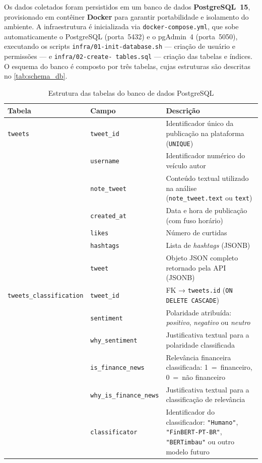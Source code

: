 Os dados coletados foram persistidos em um banco de dados \textbf{PostgreSQL~15}, provisionado em contêiner \textbf{Docker} para garantir portabilidade e isolamento do ambiente. A infraestrutura é inicializada via \texttt{docker-compose.yml}, que sobe automaticamente o PostgreSQL (porta~5432) e o pgAdmin~4 (porta~5050), executando os scripts \texttt{infra/01-init-database.sh} --- criação de usuário e permissões --- e \texttt{infra/02-create- tables.sql} --- criação das tabelas e índices. O esquema do banco é composto por três tabelas, cujas estruturas são descritas no \autoref{tab:schema_db}.

\begin{table}[!htb]
	\caption{Estrutura das tabelas do banco de dados PostgreSQL}
	\label{tab:schema_db}
	
	\begin{tabular}{p{4.5cm}p{4.5cm}p{5.8cm}}
		\hline
		\textbf{Tabela} & \textbf{Campo} & \textbf{Descrição} \\
		\hline
		\texttt{tweets} & \texttt{tweet\_id} & Identificador único da publicação na plataforma (\texttt{UNIQUE}) \\ & \texttt{username} & Identificador numérico do veículo autor \\
		& \texttt{note\_tweet} & Conteúdo textual utilizado na análise (\texttt{note\_tweet.text} ou \texttt{text}) \\ & \texttt{created\_at} & Data e hora de publicação (com fuso horário) \\ & \texttt{likes}
		& Número de curtidas \\ & \texttt{hashtags} & Lista de \textit{hashtags} (JSONB) \\ & \texttt{tweet} & Objeto JSON completo retornado pela API
		(JSONB) \\
		\hline
		\texttt{tweets\_classification} & \texttt{tweet\_id} & FK → \texttt{tweets.id} (\texttt{ON DELETE CASCADE}) \\ & \texttt{sentiment} & Polaridade atribuída: \textit{positivo}, \textit{negativo} ou \textit{neutro} \\ & \texttt{why\_sentiment} & Justificativa textual para a polaridade classificada \\ & \texttt{is\_finance\_news}   & Relevância financeira classificada: 1~=~financeiro, 0~=~não financeiro \\ & \texttt{why\_is\_finance\_news} & Justificativa textual para a classificação de relevância \\ & \texttt{classificator} & Identificador do classificador: \texttt{"Humano"}, \texttt{"FinBERT-PT-BR"}, \texttt{"BERTimbau"} ou outro modelo futuro \\

\end{tabular}
\end{table}
